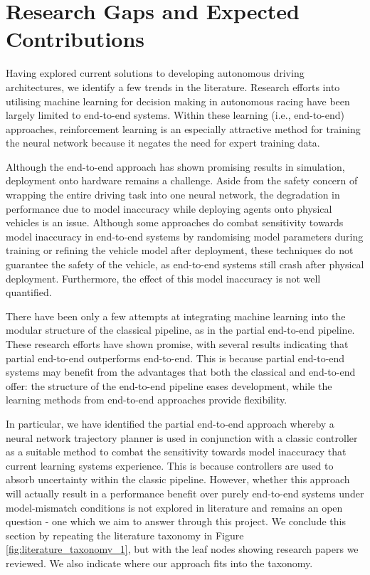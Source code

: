 \section{Research Gaps and Expected Contributions}
\label{research_gap}
Having explored current solutions to developing autonomous driving architectures, we identify a few trends in the literature.
Research efforts into utilising machine learning for decision making in autonomous racing have been largely limited to end-to-end systems. 
Within these learning (i.e., end-to-end) approaches, reinforcement learning is an especially attractive method for training the neural network because it negates the need for expert training data.

Although the end-to-end approach has shown promising results in simulation, deployment onto hardware remains a challenge.
Aside from the safety concern of wrapping the entire driving task into one neural network, the degradation in performance due to model inaccuracy while deploying agents onto physical vehicles is an issue.
Although some approaches do combat sensitivity towards model inaccuracy in end-to-end systems by randomising model parameters during training or refining the vehicle model after deployment, these techniques do not guarantee the safety of the vehicle, as end-to-end systems still crash after physical deployment.
Furthermore, the effect of this model inaccuracy is not well quantified.

There have been only a few attempts at integrating machine learning into the modular structure of the classical pipeline, as in the partial end-to-end pipeline.
These research efforts have shown promise, with several results indicating that partial end-to-end outperforms end-to-end.
This is because partial end-to-end systems may benefit from the advantages that both the classical and end-to-end offer: the structure of the end-to-end pipeline eases development, while the learning methods from end-to-end approaches provide flexibility.

In particular, we have identified the partial end-to-end approach whereby a neural network trajectory planner is used in conjunction with a classic controller as a suitable method to combat the sensitivity towards model inaccuracy that current learning systems experience.
This is because controllers are used to absorb uncertainty within the classic pipeline.
However, whether this approach will actually result in a performance benefit over purely end-to-end systems under model-mismatch conditions is not explored in literature and remains an open question - one which we aim to answer through this project.
We conclude this section by repeating the literature taxonomy in Figure \ref{fig:literature_taxonomy_1}, but with the leaf nodes showing research papers we reviewed. We also indicate where our approach fits into the taxonomy.

